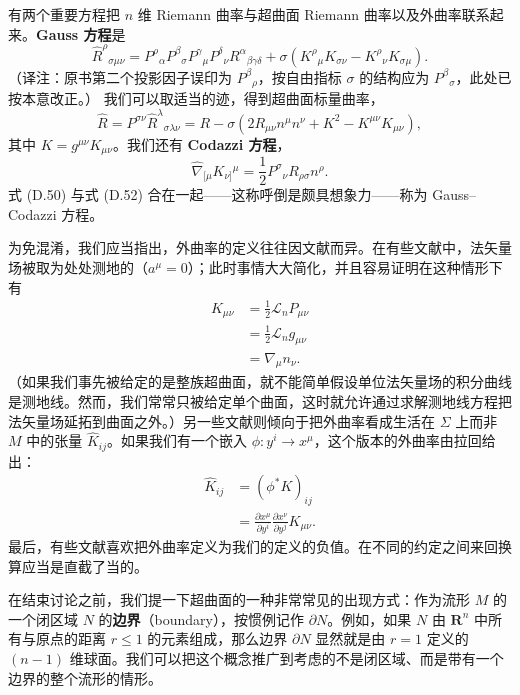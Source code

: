 有两个重要方程把 $n$ 维 Riemann 曲率与超曲面 Riemann 曲率以及外曲率联系起来。\textbf{Gauss 方程}是
\begin{equation*}
\widehat{R}^\rho{}_{\sigma\mu\nu} = P^\rho{}_\alpha P^\beta{}_\sigma P^\gamma{}_\mu P^\delta{}_\nu R^\alpha{}_{\beta\gamma\delta} + \sigma (K^\rho{}_\mu K_{\sigma\nu} - K^\rho{}_\nu K_{\sigma\mu}).
\tag{D.50}
\end{equation*}
（译注：原书第二个投影因子误印为 $P^\beta{}_\rho$，按自由指标 $\sigma$ 的结构应为 $P^\beta{}_\sigma$，此处已按本意改正。）
我们可以取适当的迹，得到超曲面标量曲率，
\begin{equation*}
\widehat{R} = P^{\sigma\nu} \widehat{R}^\lambda{}_{\sigma\lambda\nu} = R - \sigma (2 R_{\mu\nu} n^\mu n^\nu + K^2 - K^{\mu\nu} K_{\mu\nu}),
\tag{D.51}
\end{equation*}
其中 $K = g^{\mu\nu} K_{\mu\nu}$。我们还有 \textbf{Codazzi 方程}，
\begin{equation*}
\widehat{\nabla}_{[\mu} K_{\nu]}{}^\mu = \frac{1}{2} P^\sigma{}_\nu R_{\rho\sigma} n^\rho.
\tag{D.52}
\end{equation*}
式 (D.50) 与式 (D.52) 合在一起——这称呼倒是颇具想象力——称为 Gauss--Codazzi 方程。

为免混淆，我们应当指出，外曲率的定义往往因文献而异。在有些文献中，法矢量场被取为处处测地的（$a^\mu = 0$）；此时事情大大简化，并且容易证明在这种情形下有
\begin{align*}
K_{\mu\nu} &= \frac{1}{2} \mathcal{L}_n P_{\mu\nu} \\
&= \frac{1}{2} \mathcal{L}_n g_{\mu\nu} \\
&= \nabla_\mu n_\nu.
\tag{D.53}
\end{align*}
（如果我们事先被给定的是整族超曲面，就不能简单假设单位法矢量场的积分曲线是测地线。然而，我们常常只被给定单个曲面，这时就允许通过求解测地线方程把法矢量场延拓到曲面之外。）另一些文献则倾向于把外曲率看成生活在 $\Sigma$ 上而非 $M$ 中的张量 $\widehat{K}_{ij}$。如果我们有一个嵌入 $\phi : y^i \to x^\mu$，这个版本的外曲率由拉回给出：
\begin{align*}
\widehat{K}_{ij} &= (\phi^* K)_{ij} \\
&= \frac{\partial x^\mu}{\partial y^i} \frac{\partial x^\nu}{\partial y^j} K_{\mu\nu}.
\tag{D.54}
\end{align*}
最后，有些文献喜欢把外曲率定义为我们的定义的负值。在不同的约定之间来回换算应当是直截了当的。

在结束讨论之前，我们提一下超曲面的一种非常常见的出现方式：作为流形 $M$ 的一个闭区域 $N$ 的\textbf{边界}（boundary），按惯例记作 $\partial N$。例如，如果 $N$ 由 $\mathbf{R}^n$ 中所有与原点的距离 $r \leq 1$ 的元素组成，那么边界 $\partial N$ 显然就是由 $r = 1$ 定义的 $(n-1)$ 维球面。我们可以把这个概念推广到考虑的不是闭区域、而是带有一个边界的整个流形的情形。


